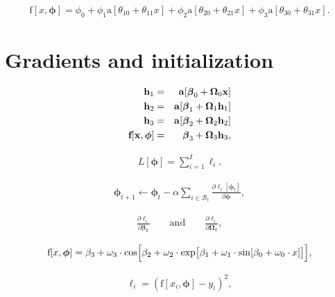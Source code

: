 \documentclass[letterpaper,twoside,openany, titlepage,oldfontcommands,titles,dvipsnames]{memoir}
\begin{document}
\begin{eqnarray}
 \mbox{f}[x,\boldsymbol\phi]  = \phi_{0}+\phi_{1}\mbox{a}[\theta_{10} + \theta_{11}x]+\phi_{2}\mbox{a}[\theta_{20} + \theta_{21}x]+\phi_{3}\mbox{a}[\theta_{30} + \theta_{31}x].
 \end{eqnarray}

 \chapter{Gradients and initialization}

\begin{eqnarray}
  \mathbf{h}_{1} &=& \mathbf{a}[\boldsymbol\beta_{0} +\boldsymbol\Omega_{0}\mathbf{x}]\nonumber \\
  \mathbf{h}_{2} &=& \mathbf{a}[\boldsymbol\beta_{1} +\boldsymbol\Omega_{1}\mathbf{h}_{1}] \nonumber\\
  \mathbf{h}_{3} &=& \mathbf{a}[\boldsymbol\beta_{2} +\boldsymbol\Omega_{2}\mathbf{h}_{2}] \nonumber\\
  \mbox{\bf f}[\mathbf{x},\boldsymbol\phi] &=& \boldsymbol\beta_{3} +\boldsymbol\Omega_{3}\mathbf{h}_{3},
 \end{eqnarray}

\begin{eqnarray}
  L[\boldsymbol\phi]= \sum_{i=1}^{I} \ell_{i}.
 \end{eqnarray}

\begin{eqnarray}\label{eq:train2_sgd}
  \boldsymbol\phi_{t+1}\longleftarrow\boldsymbol\phi_{t} - \alpha \sum_{i\in\mathcal{B}_{t}}\frac{\partial \ell_{i}[\boldsymbol\phi_{t}]}{\partial \boldsymbol\phi},
 \end{eqnarray}

\begin{eqnarray}
  \frac{\partial \ell_{i}}{\partial\boldsymbol\beta_{k}} \quad\quad \mbox{and} \quad\quad \frac{\partial \ell_{i}}{\partial\boldsymbol\Omega_{k}},
 \end{eqnarray}

\begin{eqnarray}
  \mbox{f}[x,\boldsymbol\phi] = \beta_3+\omega_3\cdot\cos\Bigl[\beta_2+\omega_2\cdot\exp\bigl[\beta_1+\omega_1\cdot\sin[\beta_0+\omega_0\cdot x]\bigr]\Bigr],
 \end{eqnarray}

\begin{eqnarray}
 \ell_i = (\mbox{f}[x_i,\boldsymbol\phi]-y_i)^2,
 \end{eqnarray}
\end{document}
